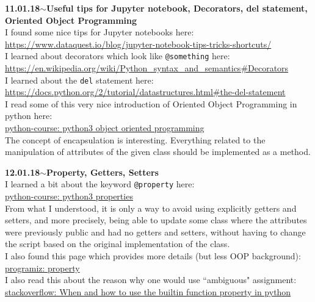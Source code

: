 \documentclass[11pt,a4paper]{article}
\newenvironment{loggentry}[2]%
{\noindent\textbf{#1}\hspace{1cm}$\mathbf{\sim}$\text{ }\textbf{#2}\\}{\vspace{0.5cm}}
\begin{document}
\begin{loggentry}{11.01.18}{Useful tips for Jupyter notebook, Decorators, del statement, Oriented Object Programming}
I found some nice tips for Jupyter notebooks here:\\
\url{https://www.dataquest.io/blog/jupyter-notebook-tips-tricks-shortcuts/}\\
I learned about decorators which look like \texttt{@something} here:\\
\url{https://en.wikipedia.org/wiki/Python_syntax_and_semantics#Decorators}\\
I learned about the \texttt{del} statement here:\\
\url{https://docs.python.org/2/tutorial/datastructures.html#the-del-statement}\\
I read some of this very nice introduction of Oriented Object Programming in python here:\\
\href{https://www.python-course.eu/python3_object_oriented_programming.php}{python-course: python3 object oriented programming}\\
The concept of encapsulation is interesting. Everything related to the manipulation of attributes of the given class should be implemented as a method.
\end{loggentry}

\begin{loggentry}{12.01.18}{Property, Getters, Setters}
I learned a bit about the keyword \texttt{@property} here:\\
\href{https://www.python-course.eu/python3_properties.php}{python-course: python3 properties}\\
From what I understood, it is only a way to avoid using explicitly getters and setters, and more precisely, being able to update some class where the attributes were previously public and had no getters and setters, without having to change the script based on the original implementation of the class.\\
I also found this page which provides more details (but less OOP background):\\
\href{https://www.programiz.com/python-programming/property}{programiz: property}\\
I also read this about the reason why one would use ``ambiguous" assignment:\\
\href{https://stackoverflow.com/questions/1554546/when-and-how-to-use-the-builtin-function-property-in-python}{stackoverflow: When and how to use the builtin function property in python}
\end{loggentry}
\end{document}

